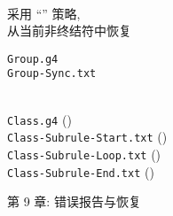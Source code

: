 \begin{frame}{}
  \begin{center}
    \texttt{\bf {}} \\[20pt]

    \pause
    采用 ``'' 策略, \\[5pt]
    从当前非终结符中恢复

    \pause
    \vspace{1.00cm}
    \texttt{Group.g4} \\[15pt]
    \texttt{Group-Sync.txt}

    \pause
    \vspace{1.00cm}
  \end{center}
\end{frame}

\begin{frame}{}
  \begin{center}
     \\[20pt]

    \texttt{Class.g4} (\texttt{}) \\[20pt]
    \pause
    \texttt{Class-Subrule-Start.txt} () \\[10pt]
    \pause
    \texttt{Class-Subrule-Loop.txt} () \\[10pt]
    \pause
    \texttt{Class-Subrule-End.txt} ()
  \end{center}
\end{frame}

\begin{frame}{}

  \begin{center}
    第 9 章: 错误报告与恢复
  \end{center}
\end{frame}
